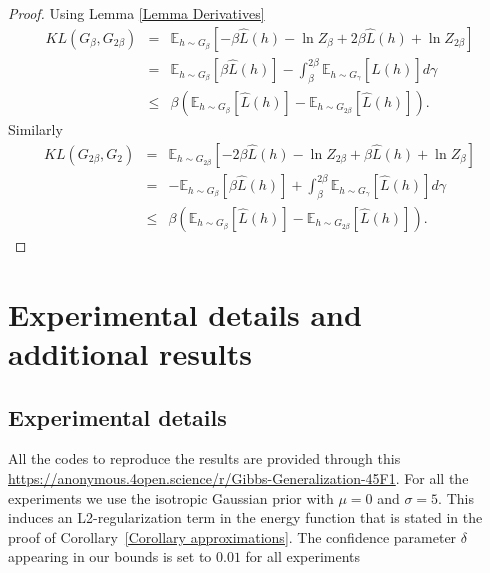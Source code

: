 \documentclass{article} %
\begin{document}
\begin{proof}
 Using Lemma \ref{Lemma Derivatives}	\begin{eqnarray*}
		KL\left( G_{\beta },G_{2\beta }\right) &=&\mathbb{E}_{h\sim G_{\beta }}\left[
		-\beta \hat{L}\left( h\right) -\ln Z_{\beta }+2\beta \hat{L}\left( h\right)
		+\ln Z_{2\beta }\right] \\
		&=&\mathbb{E}_{h\sim G_{\beta }}\left[ \beta \hat{L}\left( h\right) \right]
		-\int_{\beta }^{2\beta }\mathbb{E}_{h\sim G_{\gamma }}\left[ \hat{L}\left(
		h\right) \right] d\gamma \\
		&\leq &\beta \left( \mathbb{E}_{h\sim G_{\beta }}\left[ \hat{L}\left(
		h\right) \right] -\mathbb{E}_{h\sim G_{2\beta }}\left[ \hat{L}\left(
		h\right) \right] \right).
	\end{eqnarray*}%
	Similarly%
	\begin{eqnarray*}
		KL\left( G_{2\beta },G_{2}\right) &=&\mathbb{E}_{h\sim G_{2\beta }}\left[
		-2\beta \hat{L}\left( h\right) -\ln Z_{2\beta }+\beta \hat{L}\left( h\right)
		+\ln Z_{\beta }\right] \\
		&=&-\mathbb{E}_{h\sim G_{\beta }}\left[ \beta \hat{L}\left( h\right) \right]
		+\int_{\beta }^{2\beta }\mathbb{E}_{h\sim G_{\gamma }}\left[ \hat{L}\left(
		h\right) \right] d\gamma \\
		&\leq &\beta \left( \mathbb{E}_{h\sim G_{\beta }}\left[ \hat{L}\left(
		h\right) \right] -\mathbb{E}_{h\sim G_{2\beta }}\left[ \hat{L}\left(
		h\right) \right] \right).
	\end{eqnarray*}
\end{proof}

\section{Experimental details and additional results}

\subsection{Experimental details}
All the codes to reproduce the results are provided through this \url{https://anonymous.4open.science/r/Gibbs-Generalization-45F1}. For all the experiments we use the isotropic Gaussian prior with $\mu =0$ and $\sigma = 5$. This induces an L2-regularization term in the energy function that is stated in the proof of Corollary~\ref{Corollary approximations}. The confidence parameter $\delta$ appearing in our bounds is set to $0.01$ for all experiments
\end{document}
